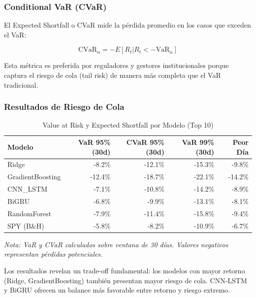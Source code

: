 \subsubsection{Conditional VaR (CVaR)}

El Expected Shortfall o CVaR mide la p\'erdida promedio en los casos que exceden el VaR:

\begin{equation}
\text{CVaR}_{\alpha} = -E[R_t | R_t < -\text{VaR}_{\alpha}]
\label{eq:cvar}
\end{equation}

Esta m\'etrica es preferida por reguladores y gestores institucionales porque captura el riesgo de cola (tail risk) de manera m\'as completa que el VaR tradicional.

\subsubsection{Resultados de Riesgo de Cola}

\begin{table}[htbp]
\centering
\caption{Value at Risk y Expected Shortfall por Modelo (Top 10)}
\label{tab:var_cvar}
\small
\begin{tabular}{@{}lrrrr@{}}
\toprule
\textbf{Modelo} & \textbf{VaR 95\% (30d)} & \textbf{CVaR 95\% (30d)} & \textbf{VaR 99\% (30d)} & \textbf{Peor D\'ia} \\
\midrule
Ridge & -8.2\% & -12.1\% & -15.3\% & -9.8\% \\
GradientBoosting & -12.4\% & -18.7\% & -22.1\% & -14.2\% \\
CNN\_LSTM & -7.1\% & -10.8\% & -14.2\% & -8.9\% \\
BiGRU & -6.8\% & -9.9\% & -13.1\% & -8.1\% \\
RandomForest & -7.9\% & -11.4\% & -15.8\% & -9.4\% \\
\midrule
SPY (B\&H) & -5.8\% & -8.2\% & -10.9\% & -6.7\% \\
\bottomrule
\end{tabular}
\vspace{0.2cm}
\small\textit{
\small
Nota: VaR y CVaR calculados sobre ventana de 30 d\'ias. Valores negativos representan p\'erdidas potenciales.}
\end{table}

Los resultados revelan un trade-off fundamental: los modelos con mayor retorno (Ridge, GradientBoosting) tambi\'en presentan mayor riesgo de cola. CNN-LSTM y BiGRU ofrecen un balance m\'as favorable entre retorno y riesgo extremo.

